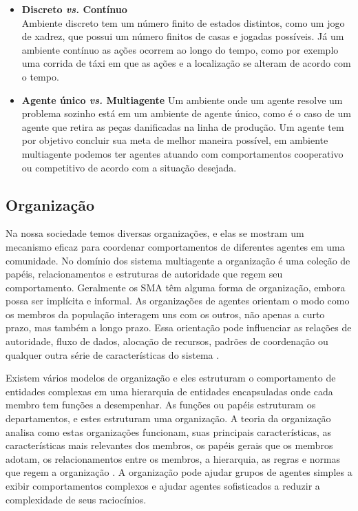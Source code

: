 \begin{itemize}
\item \textbf{Discreto \textit{vs.} Contínuo} \\
Ambiente discreto tem um número finito de estados distintos, como um jogo de xadrez, que possui um número finitos de casas e jogadas possíveis. Já um ambiente contínuo as ações ocorrem ao longo do tempo, como por exemplo uma corrida de táxi em que as ações e a localização se alteram de acordo com o tempo.

\item \textbf{Agente único \textit{vs.} Multiagente}
Um ambiente onde um agente resolve um problema sozinho está em um ambiente de agente único, como é o caso de um  agente que retira as peças danificadas na linha de produção. Um agente tem por objetivo concluir sua meta de melhor maneira possível, em ambiente multiagente podemos ter agentes atuando com comportamentos cooperativo ou competitivo de acordo com a situação desejada.
\end{itemize}

\subsection{Organização}\label{sec:orgsma}

Na nossa sociedade temos diversas organizações, e elas se mostram um mecanismo eficaz para coordenar comportamentos de diferentes agentes em uma comunidade. No domínio dos sistema multiagente a organização é uma coleção de papéis, relacionamentos e estruturas de autoridade que regem seu comportamento. Geralmente os SMA têm alguma forma de organização, embora possa ser implícita e informal. As organizações de agentes orientam o modo como os membros da população interagem uns com os outros, não apenas a curto prazo, mas também a longo prazo. Essa orientação pode influenciar as relações de autoridade, fluxo de dados, alocação de recursos, padrões de coordenação ou qualquer outra série de características do sistema \cite{horling2004survey}.

Existem vários modelos de organização e eles estruturam o comportamento de entidades complexas em uma hierarquia de entidades encapsuladas onde cada membro tem funções a desempenhar. As funções ou papéis estruturam os departamentos, e estes estruturam uma organização. A teoria da organização analisa como estas organizações funcionam, suas principais características, as características mais relevantes dos membros, os papéis gerais que os membros adotam, os relacionamentos entre os membros, a hierarquia, as regras e normas que regem a organização \cite{argente2006multi}. A organização pode ajudar grupos de agentes simples a exibir comportamentos complexos e ajudar agentes sofisticados a reduzir a complexidade de seus raciocínios.

